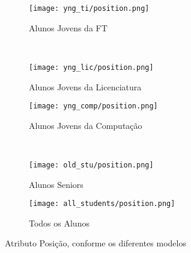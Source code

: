 \clearpage
\begin{figure}[!ht]
    \centering
    \begin{subfigure}[b]{0.48\textwidth}
        \centering
        \texttt{[image: yng\_ti/position.png]}
        \caption{Alunos Jovens da FT}
    \end{subfigure}
    ~
    \begin{subfigure}[b]{0.48\textwidth}
        \centering
        \texttt{[image: yng\_lic/position.png]}
        \caption{Alunos Jovens da Licenciatura}
    \end{subfigure}

    \begin{subfigure}[b]{0.48\textwidth}
        \centering
        \texttt{[image: yng\_comp/position.png]}
        \caption{Alunos Jovens da Computação}
    \end{subfigure}
    ~
    \begin{subfigure}[b]{0.48\textwidth}
        \centering
        \texttt{[image: old\_stu/position.png]}
        \caption{Alunos Seniors}
    \end{subfigure}

    \begin{subfigure}[b]{0.48\textwidth}
        \centering
        \texttt{[image: all\_students/position.png]}
        \caption{Todos os Alunos}
    \end{subfigure}
    \caption{Atributo Posição, conforme os diferentes modelos}
\end{figure}

